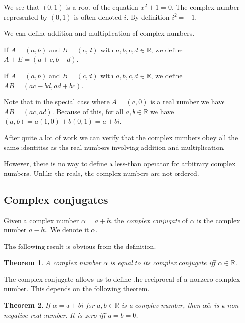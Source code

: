 \documentclass[10pt]{article}
\newcommand{\R}{\mathbb{R}}
\newtheorem{theorem}{Theorem}[section]
\newenvironment{definition}[1][Definition]{\begin{trivlist}
\item[\hskip \labelsep {\bfseries #1}]}{\end{trivlist}}
\begin{document}
We see that $(0, 1)$ is a root of the equation $x^2 + 1 = 0$. The complex number represented by $(0, 1)$ is often denoted $i$. By definition $i^2 = -1$.

We can define addition and multiplication of complex numbers.

\begin{definition}
If $A = (a, b)$ and $B = (c, d)$ with $a, b, c, d \in \R$, we define $A + B = (a + c, b + d)$.
\end{definition}

\begin{definition}
If $A = (a, b)$ and $B = (c, d)$ with $a, b, c, d \in \R$, we define $AB = (ac - bd, ad + bc)$.
\end{definition}

Note that in the special case where $A = (a, 0)$ is a real number we have $AB = (ac, ad)$. Because of this, for all $a, b \in \R$ we have $(a, b) = a(1, 0) + b(0, 1) = a + bi$.

After quite a lot of work we can verify that the complex numbers obey all the same identities as the real numbers involving addition and multiplication.

However, there is no way to define a less-than operator for arbitrary complex numbers. Unlike the reals, the complex numbers are not ordered.

\subsection{Complex conjugates}

\begin{definition}
Given a complex number $\alpha = a + bi$ the \emph{complex conjugate} of $\alpha$ is the complex number $a - bi$. We denote it $\bar{\alpha}$.
\end{definition}

The following result is obvious from the definition.

\begin{theorem}
A complex number $\alpha$ is equal to its complex conjugate iff $\alpha \in \R$.
\end{theorem}

The complex conjugate allows us to define the reciprocal of a nonzero complex number. This depends on the following theorem.

\begin{theorem}
If $\alpha = a + bi$ for $a, b \in \R$ is a complex number, then $\alpha\bar{\alpha}$ is a non-negative real number. It is zero iff $a = b = 0$.
\end{theorem}
\end{document}
